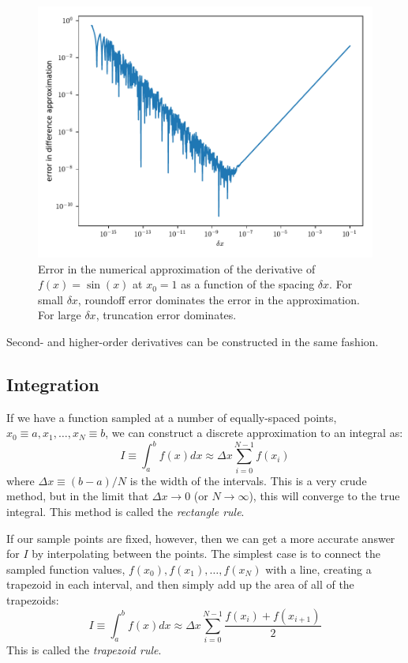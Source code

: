 \begin{figure}
  \centering
  \includegraphics[width=0.8\linewidth]{deriv_error}
  \caption[Error in numerical derivatives] {\label{fig:deriv_error}
    Error in the numerical approximation of the derivative of $f(x) =
    \sin(x)$ at $x_0 = 1$ as a function of the spacing $\delta x$.  For
    small $\delta x$, roundoff error dominates the error in the
    approximation.  For large $\delta x$, truncation error dominates.}
\end{figure}

Second- and higher-order derivatives can be constructed in the same fashion.


\subsection{Integration}

If we have a function sampled at a number of equally-spaced points,
$x_0 \equiv a, x_1, \ldots, x_N \equiv b$, we can construct a discrete
approximation to an integral as:
\begin{equation}
I \equiv \int_a^b f(x) dx \approx \Delta x \sum_{i = 0}^{N-1} f(x_i)
\end{equation}
where $\Delta x \equiv (b-a)/N$ is the width of the intervals.  This
is a very crude method, but in the limit that $\Delta x \rightarrow 0$
(or $N \rightarrow \infty$), this will converge to the true integral.
This method is called the {\em rectangle rule}.

If our sample points are fixed, however, then we can get a more accurate
answer for $I$ by interpolating between the points.  The simplest 
case is to connect the sampled function values, $f(x_0), f(x_1), \ldots, f(x_N)$ with a line, creating a trapezoid in each interval, and then simply add
up the area of all of the trapezoids:
\begin{equation}
I \equiv \int_a^b f(x) dx \approx 
  \Delta x \sum_{i = 0}^{N-1} \frac{f(x_i) + f(x_{i+1})}{2}
\end{equation}
This is called the {\em trapezoid rule}.

